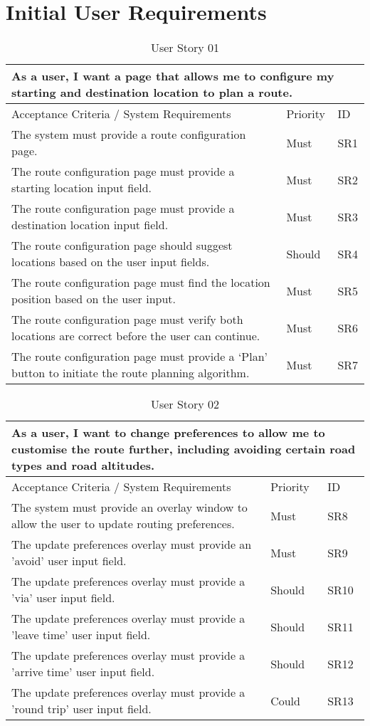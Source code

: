 \chapter{Initial User Requirements}
\label{appendix:initial-user-requirements}

\begin{table}[!h]
\caption{User Story 01}
\label{tab:user-story-01}
\begin{tabular}{ p{11cm} p{1cm}  p{1cm} }
\hline
\multicolumn{3}{p{13cm}}{As a user, I want a page that allows me to configure my starting and destination location to plan a route.}\\ 
\hline
Acceptance Criteria / System Requirements & Priority & ID\\
\hline
The system must provide a route configuration page. & Must & SR1\\
The route configuration page must provide a starting location input field. & Must & SR2\\
The route configuration page must provide a destination location input field. & Must & SR3\\ 
The route configuration page should suggest locations based on the user input fields. & Should & SR4\\ 
The route configuration page must find the location position based on the user input. & Must & SR5\\ 
The route configuration page must verify both locations are correct before the user can continue. & Must & SR6\\ 
The route configuration page must provide a ‘Plan’ button to initiate the route planning algorithm. & Must & SR7\\ 
\hline
\end{tabular}
\end{table}

\begin{table}[!htb]
\caption{User Story 02}
\label{tab:user-story-02}
\begin{tabular}{ p{11cm} p{1cm}  p{1cm} }
\hline
\multicolumn{3}{p{13cm}}{As a user, I want to change preferences to allow me to customise the route further, including avoiding certain road types and road altitudes.}\\ 
\hline
Acceptance Criteria / System Requirements & Priority & ID\\
\hline
The system must provide an overlay window to allow the user to update routing preferences. & Must & SR8 \\
The update preferences overlay must provide an 'avoid' user input field. & Must & SR9\\
The update preferences overlay must provide a 'via' user input field. & Should & SR10\\ 
The update preferences overlay must provide a 'leave time' user input field. & Should & SR11\\ 
The update preferences overlay must provide a 'arrive time' user input field. & Should & SR12\\ 
The update preferences overlay must provide a 'round trip' user input field. & Could & SR13\\ 
\hline
\end{tabular}
\end{table}

